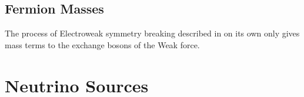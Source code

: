 \subsection{Fermion Masses}

The process of Electroweak symmetry breaking described in  on its own only gives mass terms to the exchange bosons of the Weak force.


\section{Neutrino Sources}

